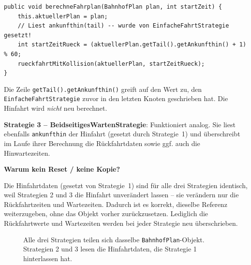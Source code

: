 \documentclass[12pt,a4paper]{article}
\begin{document}
\begin{lstlisting}[caption={EinseitigesWartenStrategie baut auf Hinfahrtdaten von Strategie 1 auf}]
public void berechneFahrplan(BahnhofPlan plan, int startZeit) {
    this.aktuellerPlan = plan;
    // Liest ankunfthin(tail) -- wurde von EinfacheFahrtStrategie gesetzt!
    int startZeitRueck = (aktuellerPlan.getTail().getAnkunfthin() + 1) % 60;
    rueckfahrtMitKollision(aktuellerPlan, startZeitRueck);
}
\end{lstlisting}

Die Zeile \texttt{getTail().getAnkunfthin()} greift auf den Wert zu, den \texttt{EinfacheFahrtStrategie} zuvor in den letzten Knoten geschrieben hat. Die Hinfahrt wird \emph{nicht} neu berechnet.

\textbf{Strategie 3 -- BeidseitigesWartenStrategie}:
Funktioniert analog. Sie liest ebenfalls \texttt{ankunfthin} der Hinfahrt (gesetzt durch Strategie~1) und überschreibt im Laufe ihrer Berechnung die Rückfahrtdaten sowie ggf. auch die Hinwartezeiten.

\textbf{Warum kein Reset / keine Kopie?}

Die Hinfahrtdaten (gesetzt von Strategie~1) sind für alle drei Strategien identisch, weil Strategien 2 und 3 die Hinfahrt unverändert lassen -- sie verändern nur die Rückfahrtzeiten und Wartezeiten. Dadurch ist es korrekt, dieselbe Referenz weiterzugeben, ohne das Objekt vorher zurückzusetzen. Lediglich die Rückfahrtwerte und Wartezeiten werden bei jeder Strategie neu überschrieben.

\begin{figure}[H]
\centering
{}
\caption{Alle drei Strategien teilen sich dasselbe \texttt{BahnhofPlan}-Objekt. Strategien 2 und 3 lesen die Hinfahrtdaten, die Strategie 1 hinterlassen hat.}
\end{figure}
\end{document}
